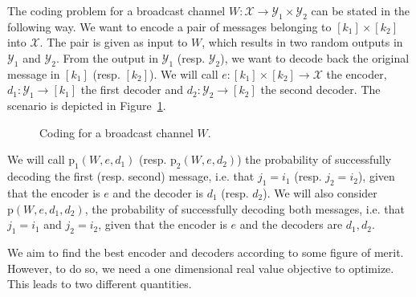 The coding problem for a broadcast channel $W : \mathcal{X} \rightarrow \mathcal{Y}_1 \times \mathcal{Y}_2$ can be stated in the following way. We want to encode a pair of messages belonging to $[k_1] \times [k_2]$ into $\mathcal{X}$. The pair is given as input to $W$, which results in two random outputs in $\mathcal{Y}_1$ and $\mathcal{Y}_2$. From the output in $\mathcal{Y}_1$ (resp. $\mathcal{Y}_2$), we want to decode back the original message in $[k_1]$ (resp. $[k_2]$). We will call $e : [k_1] \times [k_2] \rightarrow \mathcal{X}$ the encoder, $d_1 : \mathcal{Y}_1 \rightarrow [k_1]$ the first decoder and $d_2 : \mathcal{Y}_2 \rightarrow [k_2]$ the second decoder. The scenario is depicted in Figure~\ref{fig:BCcoding}.

\begin{figure}[!h]
\begin{center}
\end{center}
\caption{Coding for a broadcast channel $W$.}
\label{fig:BCcoding}
\end{figure}

We will call $\mathrm{p}_1(W,e,d_1)$ (resp. $\mathrm{p}_2(W,e,d_2)$) the probability of successfully decoding the first (resp. second) message, i.e. that $j_1 = i_1$ (resp. $j_2 = i_2$), given that the encoder is $e$ and the decoder is $d_1$ (resp. $d_2$). We will also consider $\mathrm{p}(W,e,d_1,d_2)$, the probability of successfully decoding both messages, i.e. that $j_1 = i_1$ and  $j_2 = i_2$, given that the encoder is $e$ and the decoders are $d_1,d_2$.

We aim to find the best encoder and decoders according to some figure of merit. However, to do so, we need a one dimensional real value objective to optimize. This leads to two different quantities.

